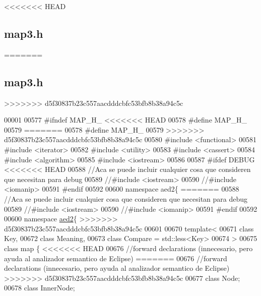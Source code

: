 <<<<<<< HEAD
\hypertarget{map3_8h_source}{\subsection{map3.\-h}
}
=======
\hypertarget{map3_8h_source}{}\subsection{map3.\+h}
>>>>>>> d5f30837b23c557aacdddcbfc53bfb8b38a94c5c

\begin{DoxyCode}
00001 
00577 \textcolor{preprocessor}{#ifndef MAP\_H\_}
<<<<<<< HEAD
00578 \textcolor{preprocessor}{}\textcolor{preprocessor}{#define MAP\_H\_}
00579 \textcolor{preprocessor}{}
=======
00578 \textcolor{preprocessor}{#define MAP\_H\_}
00579 
>>>>>>> d5f30837b23c557aacdddcbfc53bfb8b38a94c5c
00580 \textcolor{preprocessor}{#include <functional>}
00581 \textcolor{preprocessor}{#include <iterator>}
00582 \textcolor{preprocessor}{#include <utility>}
00583 \textcolor{preprocessor}{#include <cassert>}
00584 \textcolor{preprocessor}{#include <algorithm>}
00585 \textcolor{preprocessor}{#include <iostream>}
00586 
00587 \textcolor{preprocessor}{#ifdef DEBUG}
<<<<<<< HEAD
00588 \textcolor{preprocessor}{}\textcolor{comment}{//Aca se puede incluir cualquier cosa que consideren que necesitan para debug}
00589 \textcolor{comment}{//#include <iostream>}
00590 \textcolor{comment}{//#include <iomanip>}
00591 \textcolor{preprocessor}{#endif}
00592 \textcolor{preprocessor}{}
00600 \textcolor{keyword}{namespace }aed2\{
=======
00588 \textcolor{comment}{//Aca se puede incluir cualquier cosa que consideren que necesitan para debug}
00589 \textcolor{comment}{//#include <iostream>}
00590 \textcolor{comment}{//#include <iomanip>}
00591 \textcolor{preprocessor}{#endif}
00592 
00600 \textcolor{keyword}{namespace }\hyperlink{namespaceaed2}{aed2}\{
>>>>>>> d5f30837b23c557aacdddcbfc53bfb8b38a94c5c
00601 
00670 \textcolor{keyword}{template}<
00671   \textcolor{keyword}{class }Key,
00672   \textcolor{keyword}{class }Meaning,
00673   \textcolor{keyword}{class }Compare = std::less<Key>
00674 >
00675 \textcolor{keyword}{class }map \{
<<<<<<< HEAD
00676     \textcolor{comment}{//forward declarations (innecesario, pero ayuda al analizador semantico de
       Eclipse)}
=======
00676     \textcolor{comment}{//forward declarations (innecesario, pero ayuda al analizador semantico de Eclipse)}
>>>>>>> d5f30837b23c557aacdddcbfc53bfb8b38a94c5c
00677     \textcolor{keyword}{class }Node;
00678     \textcolor{keyword}{class }InnerNode;

\end{DoxyCode}
